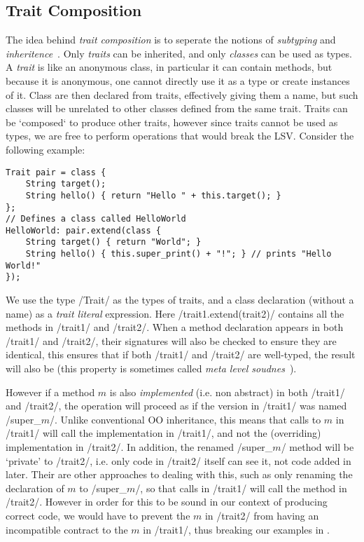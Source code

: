 \subsection{Trait Composition}\label{s:btc}
The idea behind \emph{trait composition} is to seperate the notions of \emph{subtyping} and \emph{inheritence}~\cite{useReuse}. Only \emph{traits} can be inherited, and only \emph{classes} can be used as types. A \emph{trait} is like an anonymous class, in particular it can contain methods, but because it is anonymous, one cannot directly use it as a type or create instances of it. Class are then declared from traits, effectively giving them a name, but such classes will be unrelated to other classes defined from the same trait. Traits can be `composed` to produce other traits, however since traits cannot be used as types, we are free to perform operations that would break the LSV. Consider the following example:
\begin{lstlisting}
Trait pair = class {
	String target();
	String hello() { return "Hello " + this.target(); }
};
// Defines a class called HelloWorld
HelloWorld: pair.extend(class {
	String target() { return "World"; }
	String hello() { this.super_print() + "!"; } // prints "Hello World!"
});
\end{lstlisting}
We use the type /Trait/ as the types of traits, and a class declaration (without a name) as a \emph{trait literal} expression. Here /trait1.extend(trait2)/ contains all the methods in /trait1/ and /trait2/. When a method declaration appears in both /trait1/ and /trait2/, their signatures will also be checked to ensure they are identical, this ensures that if both /trait1/ and /trait2/ are well-typed, the result will also be (this property is sometimes called \emph{meta level soudnes}~\cite{Servetto:2010:MMC:1869459.1869498}).

However if a method $m$ is also \emph{implemented} (i.e. non abstract) in both /trait1/ and /trait2/, the operation will proceed as if the version in /trait1/ was named /super_$m$/. Unlike conventional OO inheritance, this means that calls to $m$ in /trait1/ will call the implementation in /trait1/, and not the (overriding) implementation in /trait2/. In addition, the renamed /super_$m$/ method will be `private' to /trait2/, i.e. only code in /trait2/ itself can see it, not code added in later. Their are other approaches to dealing with this, such as only renaming the declaration of $m$ to /super_$m$/, so that calls in /trait1/ will call the method in /trait2/. However in order for this to be sound in our context of producing correct code, we would have to prevent the $m$ in /trait2/ from having an incompatible contract to the $m$ in /trait1/, thus breaking our examples in .

